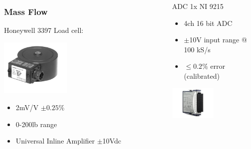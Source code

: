 \documentclass[10pt]{beamer}
\begin{document}

\begin{frame}


\begin{columns}
\begin{column}{0.5\textwidth}
  \frametitle{Mass Flow}
Honeywell 3397 Load cell:
 \begin{center}
     \includegraphics[width=0.4\textwidth]{load}
     \end{center}
\begin{itemize}
\item 2mV/V $\pm 0.25\%$ 
\item 0-200lb range
\item Universal Inline Amplifier $\pm$10Vdc

\end{itemize}
\end{column}
\begin{column}{0.5\textwidth}  %
   
  ADC 1x NI 9215 
     
     \begin{itemize}
      \item 4ch 16 bit ADC
      \item $\pm$10V input range @ 100 kS/s
      \item $\leq 0.2\%$ error (calibrated)
      \end{itemize}
      
       \begin{center}
     \includegraphics[width=0.5\textwidth]{adc}
     \end{center}
\end{column}
\end{columns}
\end{frame}
\end{document}
